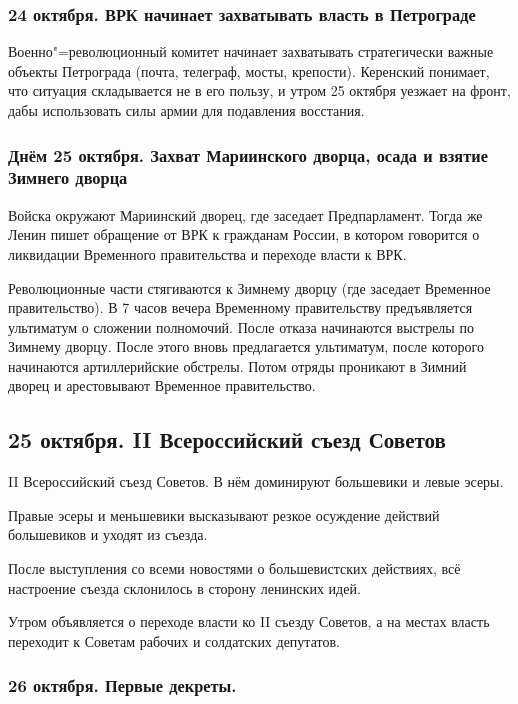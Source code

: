 \subsubsection{\textbf{24 октября. ВРК начинает захватывать власть в Петрограде}}

Военно"=революционный комитет начинает захватывать стратегически важные объекты Петрограда (почта, телеграф, мосты, крепости). Керенский понимает, что ситуация складывается не в его пользу, и утром 25 октября уезжает на фронт, дабы использовать силы армии для подавления восстания.

\subsubsection{\textbf{Днём 25 октября. Захват Мариинского дворца, осада и взятие Зимнего дворца}}
Войска окружают Мариинский дворец, где заседает Предпарламент. Тогда же Ленин пишет обращение от ВРК к гражданам России, в котором говорится о ликвидации Временного правительства и переходе власти к ВРК.

Революционные части стягиваются к Зимнему дворцу (где заседает Временное правительство). В 7 часов вечера Временному правительству предъявляется ультиматум о сложении полномочий. После отказа начинаются выстрелы по Зимнему дворцу. После этого вновь предлагается ультиматум, после которого начинаются артиллерийские обстрелы. Потом отряды проникают в Зимний дворец и арестовывают Временное правительство. 

\subsection{25 октября. II Всероссийский съезд Советов}

II Всероссийский съезд Советов. В нём доминируют большевики и левые эсеры.

Правые эсеры и меньшевики высказывают резкое осуждение действий большевиков и уходят из съезда.

После выступления со всеми новостями о большевистских действиях, всё настроение съезда склонилось в сторону ленинских идей.

Утром объявляется о переходе власти ко II съезду Советов, а на местах власть переходит к Советам рабочих и солдатских депутатов.

\subsubsection{\textbf{26 октября. Первые декреты.}}

